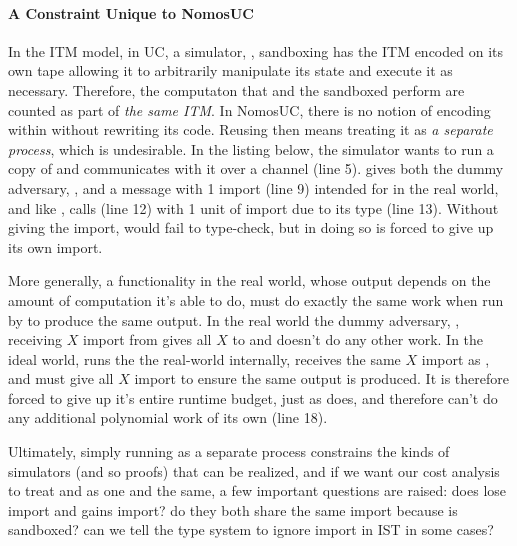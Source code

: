 \paragraph*{\textbf{A Constraint Unique to NomosUC}}
In the ITM model, in UC, a simulator, \Sim, sandboxing \Fdb has the ITM encoded on its own tape allowing it to arbitrarily manipulate its state and execute it as necessary.
Therefore, the computaton that \Sim and the sandboxed \Fdb perform are counted as part of \emph{the same ITM}.
In NomosUC, there is no notion of encoding \Fdb within \Sim without rewriting its code.
Reusing \Fdb then means treating it as \emph{a separate process}, which is undesirable.
In the listing below, the simulator wants to run a copy of \Fdb and communicates with it over a channel  (line 5). 
\Z gives both the dummy adversary, \DA, and \Sim a message with 1 import (line 9) intended for \Fdb in the real world, and like \DA, \Sim calls \Fdb (line 12) with 1 unit of import due to its type  (line 13).
Without giving the import, \Sim would fail to type-check, but in doing so is forced to give up its own import.

More generally, a functionality in the real world, whose output depends on the amount of computation it's able to do, must do exactly the same work when run by \Sim to produce the same output.
In the real world the dummy adversary, \DA, receiving $X$ import from \Z gives all $X$ to \F and doesn't do any other work.
In the ideal world, \Sim runs the the real-world internally, receives the same $X$ import as \DA, and must give \F all $X$ import to ensure the same output is produced. 
It is therefore forced to give up it's entire runtime budget, just as \DA does, and therefore can't do any additional polynomial work of its own (line 18).

Ultimately, simply running \Fdb as a separate process constrains the kinds of simulators (and so proofs) that can be realized, and if we want our cost analysis to treat \Fdb and \Sim as one and the same, a few important questions are raised:
does \Sim lose import and \Fdb gains import? do they both share the same import because \Fdb is sandboxed? can we tell the type system to ignore import in IST in some cases?

